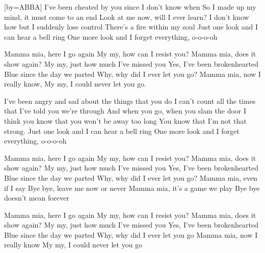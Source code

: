 [by={ABBA}]
\beginverse
I've been cheated by you since I don't know when
So I made up my mind, it must come to an end
Look at me now, will I ever learn?
I don't know how but I suddenly lose control
There's a fire within my soul
Just one look and I can hear a bell ring
One more look and I forget everything, o-o-o-oh
\endverse

\beginchorus 
Mamma mia, here I go again
My my, how can I resist you?
Mamma mia, does it show again?
My my, just how much I've missed you
Yes, I've been brokenhearted
Blue since the day we parted
Why, why did I ever let you go?
Mamma mia, now I really know,
My my, I could never let you go.
\endchorus 

\beginverse
I've been angry and sad about the things that you do
I can't count all the times that I've told you we're through
And when you go, when you slam the door
I think you know that you won't be away too long
You know that I'm not that strong.
Just one look and I can hear a bell ring
One more look and I forget everything, o-o-o-oh
\endverse

\beginchorus
Mamma mia, here I go again
My my, how can I resist you?
Mamma mia, does it show again?
My my, just how much I've missed you
Yes, I've been brokenhearted
Blue since the day we parted
Why, why did I ever let you go?
Mamma mia, even if I say
Bye bye, leave me now or never
Mamma mia, it's a game we play
Bye bye doesn't mean forever
\endchorus 

\beginchorus
Mamma mia, here I go again
My my, how can I resist you?
Mamma mia, does it show again?
My my, just how much I've missed you
Yes, I've been brokenhearted
Blue since the day we parted
Why, why did I ever let you go
Mamma mia, now I really know
My my, I could never let you go
\endchorus 
\endsong

